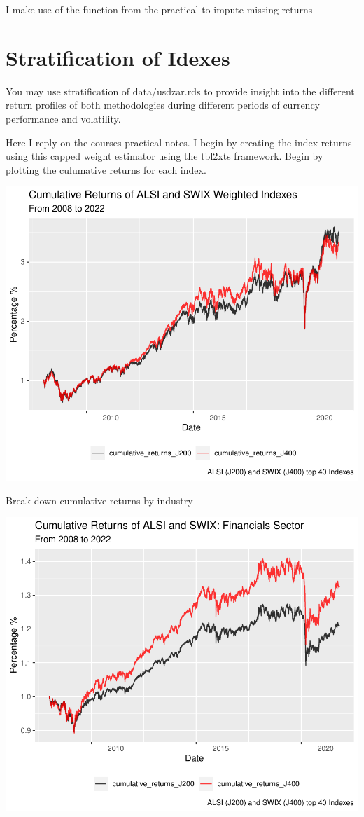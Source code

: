 \documentclass[11pt,preprint, authoryear]{elsarticle}
\numberwithin{equation}{section}
\numberwithin{figure}{section}
\numberwithin{table}{section}
\begin{document}
I make use of the function from the practical to impute missing returns

\hypertarget{stratification-of-idexes}{%
\section{Stratification of Idexes}\label{stratification-of-idexes}}

You may use stratification of data/usdzar.rds to provide insight into
the different return profiles of both methodologies during different
periods of currency performance and volatility.

Here I reply on the courses practical notes. I begin by creating the
index returns using this capped weight estimator using the tbl2xts
framework. Begin by plotting the culumative returns for each index.

\includegraphics{Question3_files/figure-latex/unnamed-chunk-2-1.pdf}

Break down cumulative returns by industry

\includegraphics{Question3_files/figure-latex/unnamed-chunk-3-1.pdf}
\end{document}
